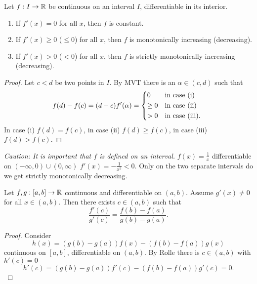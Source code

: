 \documentclass[10pt, a4paper]{article}
\begin{document}
\begin{theorem}
    Let $f : I \to \mathbb{R}$ be continuous on an interval $I$,
    differentiable in its interior.
    \begin{enumerate}[label = (\roman*)]
        \item If $f'(x) = 0$ for all $x$,
        then $f$ is constant.

        \item If $f'(x) \geq 0$
        ($\leq 0$)
        for all $x$,
        then $f$ is monotonically increasing
        (decreasing).

        \item If $f'(x) > 0$
        ($< 0$)
        for all $x$,
        then $f$ is strictly monotonically increasing
        (decreasing).
    \end{enumerate}
    \begin{proof}
        Let $c < d$ be two points in $I$.
        By MVT there is an $\alpha \in (c, d)$ such that
        \[
        f(d) - f(c) = (d - c)f'(\alpha) = \begin{dcases*}
            0 & in case (i) \\
            \geq 0 & in case (ii) \\
            > 0 & in case (iii).
        \end{dcases*}
        \]
        In case (i) $f(d) = f(c)$,
        in case (ii) $f(d) \geq f(c)$,
        in case (iii) $f(d) > f(c)$.
    \end{proof}
\end{theorem}

\textit{Caution:
It is important that $f$ is defined on an interval.}
$f(x) = \frac{1}{x}$ differentiable on $(-\infty, 0) \cup (0, \infty)$ $f'(x) = -\frac{1}{x ^ 2} < 0$.
Only on the two separate intervals do we get strictly monotonically decreasing.

\begin{theorem}
    Let $f, g : [a, b] \to \mathbb{R}$ continuous and differentiable on $(a, b)$.
    Assume $g'(x) \neq 0$ for all $x \in (a, b)$.
    Then there exists $c \in (a, b)$ such that
    \[
    \frac{f'(c)}{g'(c)} = \frac{f(b) - f(a)}{g(b) - g(a)}.
    \]

    \begin{proof}
        Consider
        \[
        h(x) = (g(b) - g(a))f(x) - (f(b) - f(a))g(x)
        \]
        continuous on $[a, b]$,
        differentiable on $(a, b)$.
        By Rolle there is $c \in (a, b)$ with $h'(c) = 0$
        \[
        h'(c) = (g(b) - g(a))f'(c) - (f(b) - f(a))g'(c) = 0.
        \]
    \end{proof}
\end{theorem}
\end{document}
